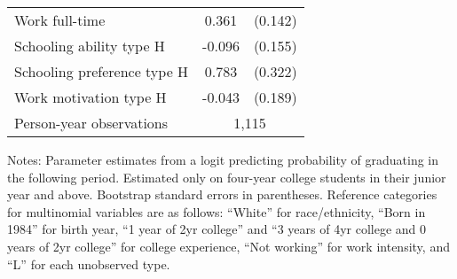 \begin{table}[ht]
\begin{threeparttable}
\begin{tabular}{lcc}
Work full-time & 0.361 & (0.142) \\ 
Schooling ability type H & -0.096 & (0.155) \\ 
Schooling preference type H & 0.783 & (0.322) \\ 
Work motivation type H & -0.043 & (0.189) \\ 
\midrule
Person-year observations & \multicolumn{2}{c}{1,115} \\ 
\bottomrule
\end{tabular}
\footnotesize Notes: Parameter estimates from a logit predicting probability of graduating in the following period. Estimated only on four-year college students in their junior year and above. Bootstrap standard errors in parentheses. Reference categories for multinomial variables are as follows: ``White'' for race/ethnicity, ``Born in 1984'' for birth year, ``1 year of 2yr college'' and ``3 years of 4yr college and 0 years of 2yr college'' for college experience, ``Not working'' for work intensity, and ``L'' for each unobserved type.
\end{threeparttable}
\end{table}
